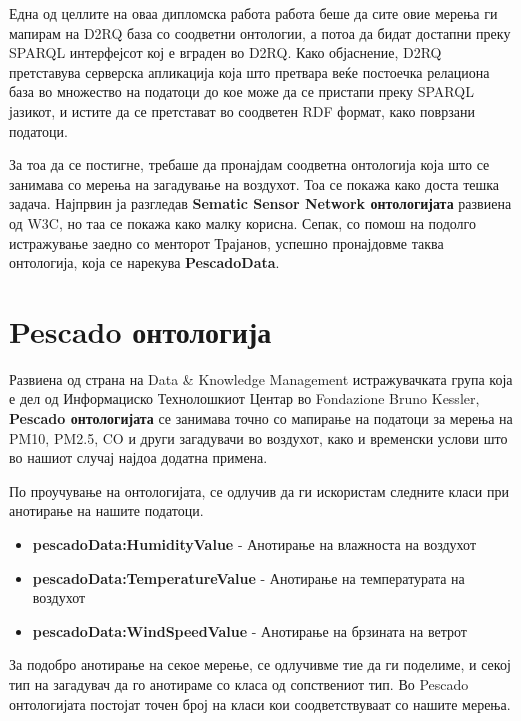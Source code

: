 \documentclass{uvamscse}
\begin{document}
Една од целлите на оваа дипломска работа работа беше да сите овие мерења ги мапирам на D2RQ база со соодветни онтологии, а потоа да бидат достапни преку SPARQL интерфејсот кој е вграден во D2RQ. Како објаснение, D2RQ претставува серверска апликација која што претвара веќе постоечка релациона база во множество на податоци до кое може да се пристапи преку SPARQL јазикот, и истите да се претстават во соодветен RDF формат, како поврзани податоци.
\vspace{5mm}


За тоа да се постигне, требаше да пронајдам соодветна онтологија која што се занимава со мерења на загадување на воздухот. Тоа се покажа како доста тешка задача. Најпрвин ја разгледав \textbf{Sematic Sensor Network онтологијата} развиена од W3C, но таа се покажа како малку корисна. Сепак, со помош на подолго истражување заедно со менторот Трајанов, успешно пронајдовме таква онтологија, која се нарекува \textbf{PescadoData}.

\section{Pescado онтологија}

Развиена од страна на Data \& Knowledge Management истражувачката група која е дел од Информациско Технолошкиот Центар во Fondazione Bruno Kessler, \textbf{Pescado онтологијата} се занимава точно со мапирање на податоци за мерења на PM10, PM2.5, CO и други загадувачи во воздухот, како и временски услови што во нашиот случај најдоа додатна примена.
\vspace{5mm}

По проучување на онтологијата, се одлучив да ги искористам следните класи при анотирање на нашите податоци.

\begin{itemize}
\item \textbf{pescadoData:HumidityValue} - Анотирање на влажноста на воздухот 
\item \textbf{pescadoData:TemperatureValue} - Анотирање на температурата на воздухот
\item \textbf{pescadoData:WindSpeedValue} - Анотирање на брзината на ветрот
\end{itemize}

За подобро анотирање на секое мерење, се одлучивме тие да ги поделиме, и секој тип на загадувач да го анотираме со класа од сопствениот тип. Во Pescado онтологијата постојат точен број на класи кои соодветствуваат со нашите мерења.
\end{document}
